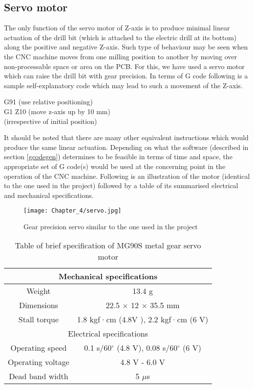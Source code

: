 \subsection{Servo motor}

The only function of the servo motor of Z-axis is to produce minimal linear actuation of the drill bit (which is attached to the electric drill at its bottom) along the positive and negative Z-axis. Such type of behaviour may be seen when the CNC machine moves from one milling position to another by moving over non-processable space or area on the PCB. For this, we have used a servo motor which can raise the drill bit with gear precision. In terms of G code following is a sample self-explanatory code which may lead to such a movement of the Z-axis.


\begin{flushleft}
 {\selectfont G91 (use relative positioning) \\
  G1 Z10 (move z-axis up by 10 mm) \\
  \hspace{18.2mm}(irrespective of initial position)
 }
\end{flushleft}

It should be noted that there are many other equivalent instructions which would produce the same linear actuation. Depending on what the software (described in section \ref{gcodegen}) determines to be feasible in terms of time and space, the appropriate set of G code(s) would be used at the concerning point in the operation of the CNC machine. Following is an illustration of the motor (identical to the one used in the project) followed by a table of its summarised electrical and mechanical specifications.

\begin{figure}[h]
 \centering
 \texttt{[image: Chapter\_4/servo.jpg]}
 \caption{Gear precision servo similar to the one used in the project}
 \label{fig:servo}
\end{figure} 

\begin{table}[h]
\def\arraystretch{1.5}
    \centering
    \caption{Table of brief specification of MG90S metal gear servo motor}
    \begin{tabular}{|c|c|}
        \hline
		\multicolumn{2}{|c|}{Mechanical specifications} \\
		\hline
		Weight & 13.4 g \\
		\hline
		Dimensions & 22.5 $\times$ 12 $\times$ 35.5 mm \\ 
		\hline 
		Stall torque & 1.8 kgf·cm (4.8V ), 2.2 kgf·cm (6 V) \\
		\hline
		\multicolumn{2}{|c|}{Electrical specifications} \\
		\hline
		Operating speed	& 0.1 s/60$^{\circ}$ (4.8 V), 0.08 s/60$^{\circ}$ (6 V) \\
		\hline
		Operating voltage &	4.8 V - 6.0 V \\
		\hline
		Dead band width & 5 $\mu$s \\
		\hline
    \end{tabular}
    \label{tab:servo_specs}
\end{table}


